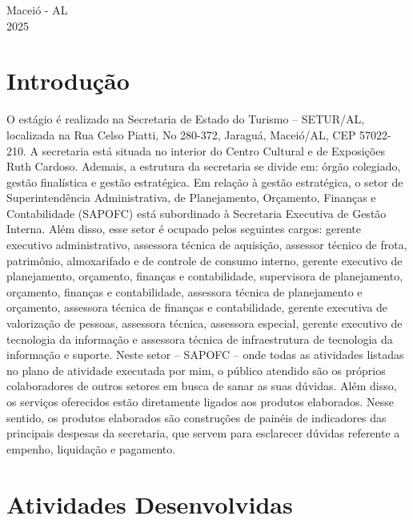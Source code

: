 \documentclass[12pt,a4paper]{article}
\begin{document}
	\vfill
	\begin{flushright}
		Maceió - AL \\
		2025
	\end{flushright}
	
	\newpage
	

	
	\section{Introdução}
	
\hspace*{1,5cm}O estágio é realizado na Secretaria de Estado do Turismo – SETUR/AL, localizada na
Rua Celso Piatti, No 280-372, Jaraguá, Maceió/AL, CEP 57022-210. A secretaria está situada
no interior do Centro Cultural e de Exposições Ruth Cardoso. Ademais, a estrutura da secretaria
se divide em: órgão colegiado, gestão finalística e gestão estratégica. Em relação à gestão
estratégica, o setor de Superintendência Administrativa, de Planejamento, Orçamento, Finanças
e Contabilidade (SAPOFC) está subordinado à Secretaria Executiva de Gestão Interna. Além
disso, esse setor é ocupado pelos seguintes cargos: gerente executivo administrativo, assessora
técnica de aquisição, assessor técnico de frota, patrimônio, almoxarifado e de controle de
consumo interno, gerente executivo de planejamento, orçamento, finanças e contabilidade,
supervisora de planejamento, orçamento, finanças e contabilidade, assessora técnica de
planejamento e orçamento, assessora técnica de finanças e contabilidade, gerente executiva de
valorização de pessoas, assessora técnica, assessora especial, gerente executivo de tecnologia
da informação e assessora técnica de infraestrutura de tecnologia da informação e suporte. Neste
setor – SAPOFC – onde todas as atividades listadas no plano de atividade executada por mim,
o público atendido são os próprios colaboradores de outros setores em busca de sanar as suas
dúvidas. Além disso, os serviços oferecidos estão diretamente ligados aos produtos elaborados.
Nesse sentido, os produtos elaborados são construções de painéis de indicadores das principais
despesas da secretaria, que servem para esclarecer dúvidas referente a empenho, liquidação e
pagamento.
	
	\section{Atividades Desenvolvidas}
	
\end{document}
